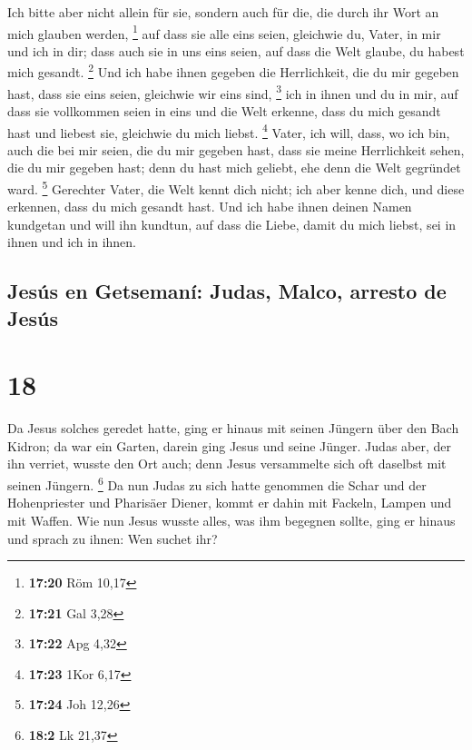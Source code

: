  Ich bitte aber nicht allein für sie, sondern auch für
die, die durch ihr Wort an mich glauben werden, \footnote{\textbf{17:20}
  Röm 10,17}  auf dass sie alle eins seien, gleichwie du,
Vater, in mir und ich in dir; dass auch sie in uns eins seien, auf dass
die Welt glaube, du habest mich gesandt. \footnote{\textbf{17:21} Gal
  3,28}  Und ich habe ihnen gegeben die Herrlichkeit, die
du mir gegeben hast, dass sie eins seien, gleichwie wir eins sind,
\footnote{\textbf{17:22} Apg 4,32}  ich in ihnen und du
in mir, auf dass sie vollkommen seien in eins und die Welt erkenne, dass
du mich gesandt hast und liebest sie, gleichwie du mich liebst.
\footnote{\textbf{17:23} 1Kor 6,17}  Vater, ich will,
dass, wo ich bin, auch die bei mir seien, die du mir gegeben hast, dass
sie meine Herrlichkeit sehen, die du mir gegeben hast; denn du hast mich
geliebt, ehe denn die Welt gegründet ward. \footnote{\textbf{17:24} Joh
  12,26}  Gerechter Vater, die Welt kennt dich nicht; ich
aber kenne dich, und diese erkennen, dass du mich gesandt hast.
 Und ich habe ihnen deinen Namen kundgetan und will ihn
kundtun, auf dass die Liebe, damit du mich liebst, sei in ihnen und ich
in ihnen.

\hypertarget{jesuxfas-en-getsemanuxed-judas-malco-arresto-de-jesuxfas}{%
\subsection{Jesús en Getsemaní: Judas, Malco, arresto de
Jesús}\label{jesuxfas-en-getsemanuxed-judas-malco-arresto-de-jesuxfas}}

\hypertarget{section-17}{%
\section{18}\label{section-17}}

 Da Jesus solches geredet hatte, ging er hinaus mit seinen
Jüngern über den Bach Kidron; da war ein Garten, darein ging Jesus und
seine Jünger.  Judas aber, der ihn verriet, wusste den Ort
auch; denn Jesus versammelte sich oft daselbst mit seinen Jüngern.
\footnote{\textbf{18:2} Lk 21,37}  Da nun Judas zu sich
hatte genommen die Schar und der Hohenpriester und Pharisäer Diener,
kommt er dahin mit Fackeln, Lampen und mit Waffen.  Wie
nun Jesus wusste alles, was ihm begegnen sollte, ging er hinaus und
sprach zu ihnen: Wen suchet ihr?

